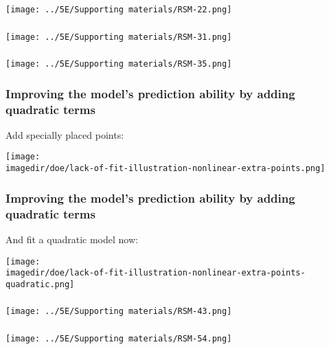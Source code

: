 \documentclass[11pt,aspectratio=169,mathserif]{beamer}
\begin{document}
\begin{frame}\frametitle{}
	\centerline{\texttt{[image: ../5E/Supporting materials/RSM-22.png]}}
\end{frame}
\begin{frame}\frametitle{}
	\centerline{\texttt{[image: ../5E/Supporting materials/RSM-31.png]}}
\end{frame}
\begin{frame}\frametitle{}
	\centerline{\texttt{[image: ../5E/Supporting materials/RSM-35.png]}}
\end{frame}
\begin{frame}\frametitle{Improving the model's prediction ability by adding quadratic terms}
	Add specially placed points:
	
	\centerline{\texttt{[image: \\imagedir/doe/lack-of-fit-illustration-nonlinear-extra-points.png]}}
\end{frame}
\begin{frame}\frametitle{Improving the model's prediction ability by adding quadratic terms}
	And fit a quadratic model now:
	
	\centerline{\texttt{[image: \\imagedir/doe/lack-of-fit-illustration-nonlinear-extra-points-quadratic.png]}}
\end{frame}
\begin{frame}\frametitle{}
	\centerline{\texttt{[image: ../5E/Supporting materials/RSM-43.png]}}
\end{frame}
\begin{frame}\frametitle{}
	\centerline{\texttt{[image: ../5E/Supporting materials/RSM-54.png]}}
\end{frame}
\end{document}

